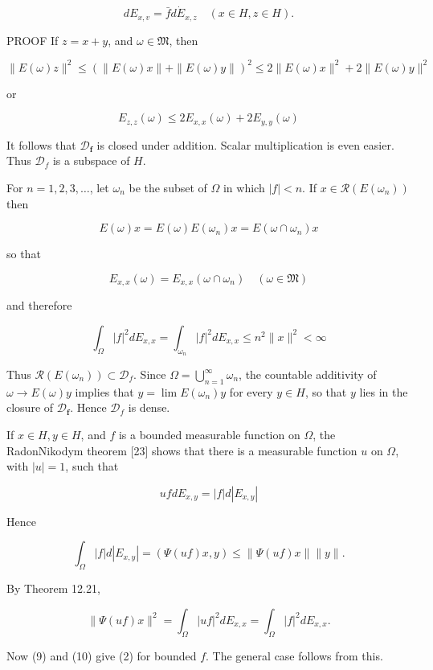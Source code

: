 \documentclass[10pt]{article}
\begin{document}
$$
d E_{x, v}=\bar{f} d \dot{E}_{x, z} \quad(x \in H, z \in H) .
$$

PROOF If $z=x+y$, and $\omega \in \mathfrak{M}$, then

$$
\|E(\omega) z\|^{2} \leq(\|E(\omega) x\|+\|E(\omega) y\|)^{2} \leq 2\|E(\omega) x\|^{2}+2\|E(\omega) y\|^{2}
$$

or

$$
E_{z, z}(\omega) \leq 2 E_{x, x}(\omega)+2 E_{y, y}(\omega)
$$

It follows that $\mathscr{D}_{\boldsymbol{f}}$ is closed under addition. Scalar multiplication is even easier. Thus $\mathscr{D}_{f}$ is a subspace of $H$.

For $n=1,2,3, \ldots$, let $\omega_{n}$ be the subset of $\Omega$ in which $|f|<n$. If $x \in \mathscr{R}\left(E\left(\omega_{n}\right)\right)$ then

$$
E(\omega) x=E(\omega) E\left(\omega_{n}\right) x=E\left(\omega \cap \omega_{n}\right) x
$$

so that

$$
E_{x, x}(\omega)=E_{x, x}\left(\omega \cap \omega_{n}\right) \quad(\omega \in \mathfrak{M})
$$

and therefore

$$
\int_{\Omega}|f|^{2} d E_{x, x}=\int_{\omega_{n}}|f|^{2} d E_{x, x} \leq n^{2}\|x\|^{2}<\infty
$$

Thus $\mathscr{R}\left(E\left(\omega_{n}\right)\right) \subset \mathscr{D}_{f}$. Since $\Omega=\bigcup_{n=1}^{\infty} \omega_{n}$, the countable additivity of $\omega \rightarrow E(\omega) y$ implies that $y=\lim E\left(\omega_{n}\right) y$ for every $y \in H$, so that $y$ lies in the closure of $\mathscr{D}_{\boldsymbol{f}}$. Hence $\mathscr{D}_{f}$ is dense.

If $x \in H, y \in H$, and $f$ is a bounded measurable function on $\Omega$, the RadonNikodym theorem [23] shows that there is a measurable function $u$ on $\Omega$, with $|u|=1$, such that

$$
u f d E_{x, y}=|f| d\left|E_{x, y}\right|
$$

Hence

$$
\int_{\Omega}|f| d\left|E_{x, y}\right|=(\Psi(u f) x, y) \leq\|\Psi(u f) x\|\|y\| .
$$

By Theorem 12.21,

$$
\|\Psi(u f) x\|^{2}=\int_{\Omega}|u f|^{2} d E_{x, x}=\int_{\Omega}|f|^{2} d E_{x, x} .
$$

Now (9) and (10) give (2) for bounded $f$. The general case follows from this.
\end{document}
